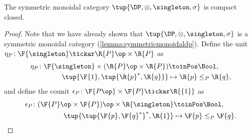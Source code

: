 \begin{lemma}
The symmetric monoidal category $\tup{\DP,\otimes,\singleton,\sigma}$ is compact closed.
\end{lemma} 
\begin{proof}
Note that we have already shown that $\tup{\DP,\otimes,\singleton,\sigma}$ is a symmetric monoidal category (\cref{lemma:symmetricmonoidaldp}). Define the unit $\eta_P\colon \F{\singleton} \tickar \R{P}\op \times \R{P} $ as
\begin{equation}
\label{eqn:unit_morphism} 
\begin{aligned}
    \eta_P \colon \F{\singleton} \times (\R{P}\op \times \R{P}) & \toinPos \Bool, \\
            \tup{\F{1},\tup{\R{p}^*,\R{q}}} & \mapsto \R{p} \leq_P \R{q},
\end{aligned}
\end{equation}
and define the counit $\epsilon_P\colon \F{P\op} \times \F{P} \tickar \R{\{1\}} $ as
\begin{equation}
\begin{aligned}
    \epsilon_P \colon (\F{P}\op \times \F{P})\op \times \R{\singleton} & \toinPos \Bool,  \\
            \tup{\tup{\F{p},\F{q}^*}^*, \R{1}} & \mapsto \F{p} \leq_P \F{q}.
\end{aligned}
\end{equation}


\end{proof}
